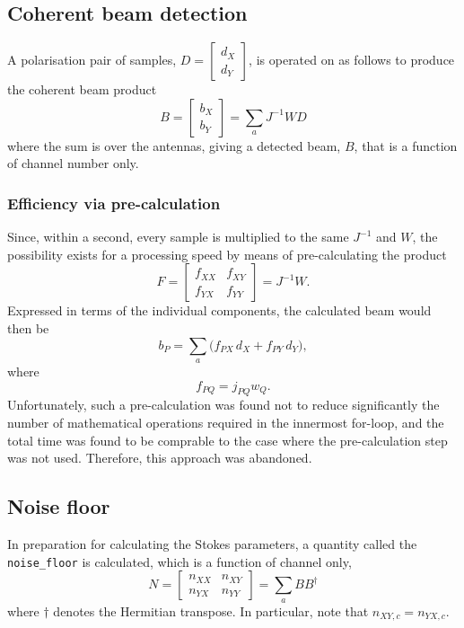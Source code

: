 \documentclass{article}
\begin{document}
\subsection{Coherent beam detection}
A polarisation pair of samples, $D = \begin{bmatrix} d_X \\ d_Y \end{bmatrix}$, is operated on as follows to produce the coherent beam product
\begin{equation}
    B = \begin{bmatrix} b_X \\ b_Y \end{bmatrix} = \sum_a J^{-1}WD
\end{equation}
where the sum is over the antennas, giving a detected beam, $B$, that is a function of channel number only.

\subsubsection{Efficiency via pre-calculation}
\label{sec:precalc1}
Since, within a second, every sample is multiplied to the same $J^{-1}$ and $W$, the possibility exists for a processing speed by means of pre-calculating the product
\begin{equation}
    F = \begin{bmatrix} f_{XX} & f_{XY} \\ f_{YX} & f_{YY} \end{bmatrix} = J^{-1} W.
\end{equation}
Expressed in terms of the individual components, the calculated beam would then be
\begin{equation}
    b_P = \sum_a \bigg(f_{PX} \, d_X + f_{PY} \, d_Y\bigg),
\end{equation}
where
\begin{equation}
    f_{PQ} = j_{PQ} w_Q.
\end{equation}
Unfortunately, such a pre-calculation was found not to reduce significantly the number of mathematical operations required in the innermost for-loop, and the total time was found to be comprable to the case where the pre-calculation step was not used.
Therefore, this approach was abandoned.

\subsection{Noise floor}
In preparation for calculating the Stokes parameters, a quantity called the \texttt{noise\_floor} is calculated, which is a function of channel only,
\begin{equation}
    N = \begin{bmatrix} n_{XX} & n_{XY} \\ n_{YX} & n_{YY} \end{bmatrix}
      = \sum_a BB^\dagger
\end{equation}
where $\dagger$ denotes the Hermitian transpose.
In particular, note that $n_{XY,c} = n_{YX,c}$.
\end{document}
